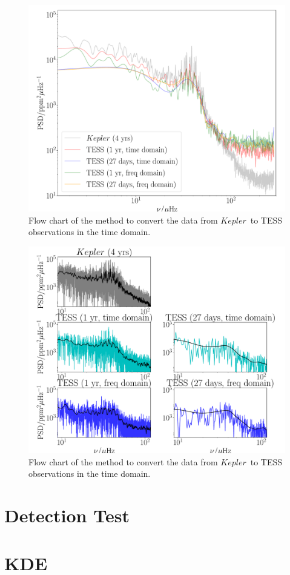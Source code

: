 \documentclass[a4paper,fleqn,usenatbib,useAMS]{mnras}
\newcommand{\kep}{\ensuremath{Kepler}}
\begin{document}
\begin{figure}
	\centering
	\includegraphics[scale=0.3]{diagnostic_plot2_full}
	\caption{Flow chart of the method to convert the data from \kep \ to TESS observations in the time domain.}	
	\label{ts flowchart}
\end{figure} 

\begin{figure}
	\centering
	\includegraphics[scale=0.3]{diagnostic_plot1_modes}
	\caption{Flow chart of the method to convert the data from \kep \ to TESS observations in the time domain.}	
	\label{ts flowchart}
\end{figure} 




\section{Detection Test}

\section{KDE}







\bsp
\label{lastpage}
\end{document}
